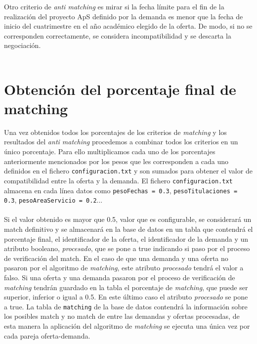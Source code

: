 \documentclass[11pt]{book}
\begin{document}
Otro criterio de \emph{anti matching} es mirar si la fecha límite para el fin de la realización del proyecto ApS definido por la demanda es menor que la fecha de inicio del cuatrimestre en el año académico elegido de la oferta. De modo, si no se corresponden correctamente, se considera incompatibilidad y se descarta la negociación. \\\\



\section{Obtención del porcentaje final de matching}

Una vez obtenidos todos los porcentajes de los criterios de \emph{matching} y los resultados del \emph{anti matching} procedemos a combinar todos los criterios en un único porcentaje. Para ello multiplicamos cada uno de los porcentajes anteriormente mencionados por los pesos que les corresponden a cada uno definidos en el fichero \texttt{configuracion.txt} y son sumados para obtener el valor de compatibilidad entre la oferta y la demanda. El fichero \texttt{configuracion.txt} almacena en cada línea datos como \texttt{pesoFechas = 0.3}, \texttt{pesoTitulaciones = 0.3}, \texttt{pesoAreaServicio = 0.2}...  \\\\

Si el valor obtenido es mayor que 0.5, valor que es configurable, se considerará un match definitivo y se almacenará en la base de datos en un tabla que contendrá el porcentaje final, el identificador de la oferta, el identificador de la demanda y un atributo booleano, \emph{procesado}, que se pone a true indicando si paso por el proceso de verificación del match. En el caso de que una demanda y una oferta no pasaron por el algoritmo de \emph{matching}, este atributo \emph{procesado} tendrá el valor a falso. Si una oferta y una demanda pasaron por el proceso de verificación de \emph{matching} tendrán guardado en la tabla el porcentaje de \emph{matching}, que puede ser superior, inferior o igual a 0.5. En este último caso el atributo \emph{procesado} se pone a true. La tabla de \texttt{matching} de la base de datos contendrá la información sobre los posibles match y no match de entre las demandas y ofertas procesadas, de esta manera la aplicación del algoritmo de \emph{matching} se ejecuta una única vez por cada pareja oferta-demanda. \\\\
\end{document}
